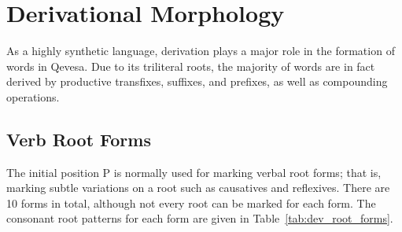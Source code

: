 \documentclass[grammar]{subfiles}
\begin{document}
  \chapter{Derivational Morphology}
  \label{ch:derivational-morphology}

  As a highly synthetic language, derivation plays a major role in the formation of words in Qevesa. Due to its triliteral roots, the majority of words are in fact derived by productive transfixes, suffixes, and prefixes, as well as compounding operations.

  \section{Verb Root Forms}
  \label{sec:dev_verb_root_forms}

  The initial position P is normally used for marking verbal root forms; that is, marking subtle variations on a root such as causatives and reflexives. There are 10 forms in total, although not every root can be marked for each form. The consonant root patterns for each form are given in Table~\ref{tab:dev_root_forms}.

\end{document}
